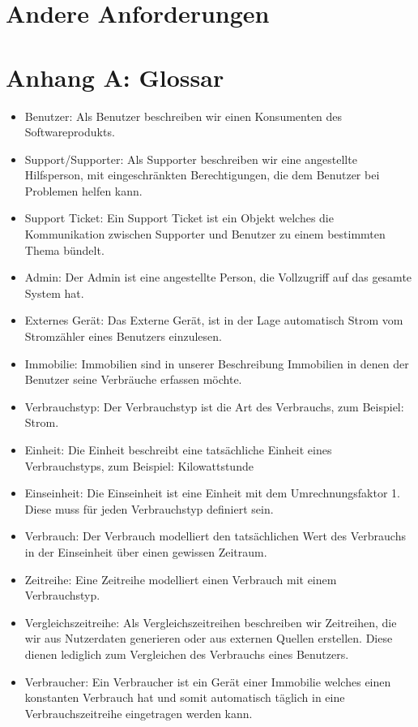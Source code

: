 \section{Andere Anforderungen}
\section*{Anhang A: Glossar}
\label{glossar}
\begin{itemize}
\item Benutzer: Als Benutzer beschreiben wir einen Konsumenten des Softwareprodukts.
\item Support/Supporter: Als Supporter beschreiben wir eine angestellte Hilfsperson, mit eingeschränkten Berechtigungen, die dem Benutzer bei Problemen helfen kann.
\item Support Ticket: Ein Support Ticket ist ein Objekt welches die Kommunikation zwischen Supporter und Benutzer zu einem bestimmten Thema bündelt.
\item Admin: Der Admin ist eine angestellte Person, die Vollzugriff auf das gesamte System hat.
\item Externes Gerät: Das Externe Gerät, ist in der Lage automatisch Strom vom Stromzähler eines Benutzers einzulesen.
\item Immobilie: Immobilien sind in unserer Beschreibung Immobilien in denen der Benutzer seine Verbräuche erfassen möchte.
\item Verbrauchstyp: Der Verbrauchstyp ist die Art des Verbrauchs, zum Beispiel: Strom.
\item Einheit: Die Einheit beschreibt eine tatsächliche Einheit eines Verbrauchstyps, zum Beispiel: Kilowattstunde
\item Einseinheit: Die Einseinheit ist eine Einheit mit dem Umrechnungsfaktor 1. Diese muss für jeden Verbrauchstyp definiert sein.
\item Verbrauch: Der Verbrauch modelliert den tatsächlichen Wert des Verbrauchs in der Einseinheit über einen gewissen Zeitraum.
\item Zeitreihe: Eine Zeitreihe modelliert einen Verbrauch mit einem Verbrauchstyp.
\item Vergleichszeitreihe: Als Vergleichszeitreihen beschreiben wir Zeitreihen, die wir aus Nutzerdaten generieren oder aus externen Quellen erstellen. Diese dienen lediglich zum Vergleichen des Verbrauchs eines Benutzers.
\item Verbraucher: Ein Verbraucher ist ein Gerät einer Immobilie welches einen konstanten Verbrauch hat und somit automatisch täglich in eine Verbrauchszeitreihe eingetragen werden kann.
\end{itemize}
